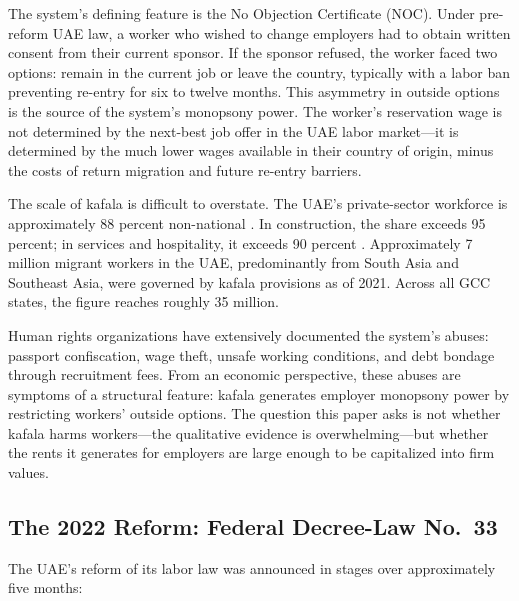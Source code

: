 \documentclass[12pt]{article}
\begin{document}
The system's defining feature is the No Objection Certificate (NOC). Under pre-reform UAE law, a worker who wished to change employers had to obtain written consent from their current sponsor. If the sponsor refused, the worker faced two options: remain in the current job or leave the country, typically with a labor ban preventing re-entry for six to twelve months. This asymmetry in outside options is the source of the system's monopsony power. The worker's reservation wage is not determined by the next-best job offer in the UAE labor market---it is determined by the much lower wages available in their country of origin, minus the costs of return migration and future re-entry barriers.

The scale of kafala is difficult to overstate. The UAE's private-sector workforce is approximately 88 percent non-national \citep{ilostat2024uae}. In construction, the share exceeds 95 percent; in services and hospitality, it exceeds 90 percent \citep{mohre2023stats}. Approximately 7 million migrant workers in the UAE, predominantly from South Asia and Southeast Asia, were governed by kafala provisions as of 2021. Across all GCC states, the figure reaches roughly 35 million.

Human rights organizations have extensively documented the system's abuses: passport confiscation, wage theft, unsafe working conditions, and debt bondage through recruitment fees. From an economic perspective, these abuses are symptoms of a structural feature: kafala generates employer monopsony power by restricting workers' outside options. The question this paper asks is not whether kafala harms workers---the qualitative evidence is overwhelming---but whether the rents it generates for employers are large enough to be capitalized into firm values.

\subsection{The 2022 Reform: Federal Decree-Law No.~33}

The UAE's reform of its labor law was announced in stages over approximately five months:
\end{document}
